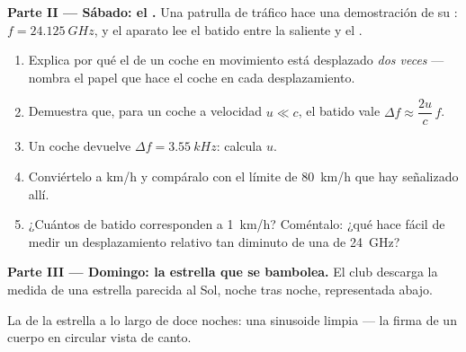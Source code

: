 \begin{problem}
\medskip
\noindent\textbf{Parte II --- Sábado: el .}
Una patrulla de tráfico hace una demostración de su :
$f = \qty{24.125}{GHz}$, y el aparato lee el batido entre la 
saliente y el .
\begin{enumerate}[resume]
  \item Explica por qué el  de un coche en movimiento está desplazado
        \emph{dos veces} --- nombra el papel que hace el coche en cada
        desplazamiento.
  \item Demuestra que, para un coche a velocidad $u \ll c$, el batido
        vale $\Delta f \approx \dfrac{2u}{c}\,f$.
  \item Un coche devuelve $\Delta f = \qty{3.55}{kHz}$: calcula $u$.
  \item Conviértelo a \unit{km/h} y compáralo con el límite de
        \qty{80}{km/h} que hay señalizado allí.
  \item ¿Cuántos  de batido corresponden a \qty{1}{km/h}?
        Coméntalo: ¿qué hace fácil de medir un desplazamiento relativo
        tan diminuto de una  de \qty{24}{GHz}?
\end{enumerate}

\medskip
\noindent\textbf{Parte III --- Domingo: la estrella que se bambolea.}
El club descarga la  medida de una estrella parecida al
Sol, noche tras noche, representada abajo.

\begin{omfigure}

{\small La  de la estrella a lo largo de doce noches:
una sinusoide limpia --- la firma de un cuerpo en  circular vista
de canto.}
\end{omfigure}


\end{problem}
